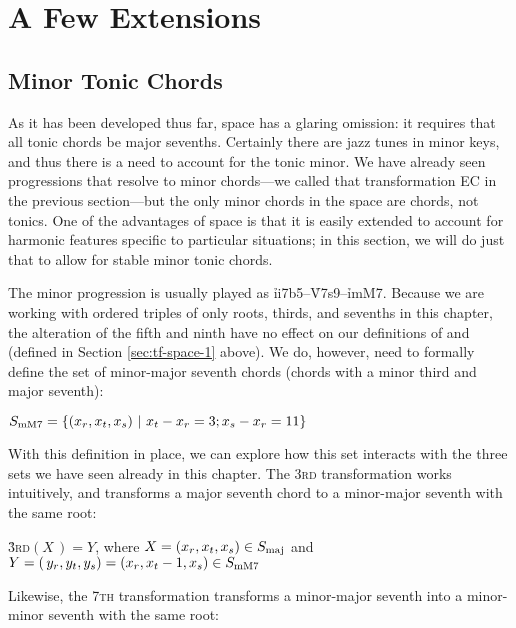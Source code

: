 \section{A Few Extensions}
\label{sec:tf-extensions}

\subsection{Minor Tonic Chords}

As it has been developed thus far, \tf space has a glaring omission: it
requires that all tonic chords be major sevenths. Certainly there are jazz
tunes in minor keys, and thus there is a need to account for the tonic minor.
We have already seen \tf progressions that resolve to minor chords---we called
that transformation EC in the previous section---but the only minor chords in
the space are \ii chords, not tonics. One of the advantages of \tf space is
that it is easily extended to account for harmonic features specific to
particular situations; in this section, we will do just that to allow for
stable minor tonic chords.

The minor \tfmo progression is usually played as
\mbox{\h{ii7b5}--\h{V7s9}--\h{i\thinspace{}mM7}}. Because
we are working with ordered triples of only roots, thirds, and sevenths in
this chapter, the alteration of the fifth and ninth have no effect on our
definitions of \Smin and \Sdom (defined in Section \ref{sec:tf-space-1}
above). We do, however, need to formally define the set of minor-major seventh
chords (chords with a minor third and major seventh):

\vspace{.5\baselineskip}
  $S_{\mathrm{mM7}} = \{ (x_r, x_t, x_s)\ |\ x_t - x_r = 3; x_s - x_r = 11 \}$
\vspace{.5\baselineskip}

With this definition in place, we can explore how this set interacts with the
three sets we have seen already in this chapter. The \textsc{3rd}
transformation works intuitively, and transforms a major seventh chord to a
minor-major seventh with the same root:

\vspace{.5\baselineskip}
  \h{3}\textsc{rd}$(X\,) = Y$, where $X = (x_r, x_t, x_s) \in S_{\mathrm{maj}}$ and
  $Y=(\,y_r, y_t, y_s)=(x_r, x_t-1, x_s) \in S_{\mathrm{mM7}}$
\vspace{.5\baselineskip}

\noindent Likewise, the \textsc{7th} transformation transforms a
minor-major seventh into a minor-minor seventh with the same root:

